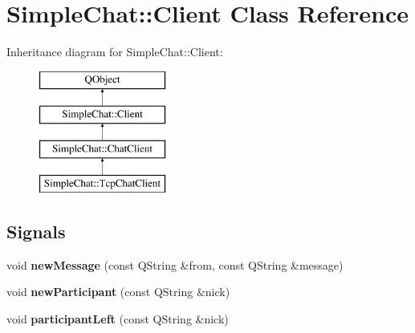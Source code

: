 \hypertarget{classSimpleChat_1_1Client}{\section{Simple\-Chat\-:\-:Client Class Reference}
\label{classSimpleChat_1_1Client}
}
Inheritance diagram for Simple\-Chat\-:\-:Client\-:\begin{figure}[H]
\begin{center}
\leavevmode
\includegraphics[height=4.000000cm]{classSimpleChat_1_1Client}
\end{center}
\end{figure}
\subsection*{Signals}
\begin{DoxyCompactItemize}
\item 
\hypertarget{classSimpleChat_1_1Client_af340df83298809f010245e79848566ff}{void {\bfseries new\-Message} (const Q\-String \&from, const Q\-String \&message)}\label{classSimpleChat_1_1Client_af340df83298809f010245e79848566ff}

\item 
\hypertarget{classSimpleChat_1_1Client_ad5cb656ab4f18f8299ece913c880e484}{void {\bfseries new\-Participant} (const Q\-String \&nick)}\label{classSimpleChat_1_1Client_ad5cb656ab4f18f8299ece913c880e484}

\item 
\hypertarget{classSimpleChat_1_1Client_a84c8aa20f1476230237234bc0d35df28}{void {\bfseries participant\-Left} (const Q\-String \&nick)}\label{classSimpleChat_1_1Client_a84c8aa20f1476230237234bc0d35df28}

\end{DoxyCompactItemize}
